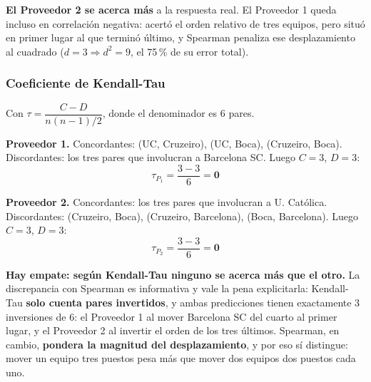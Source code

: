 \documentclass[11pt, a4paper]{article}
\begin{document}
\textbf{El Proveedor 2 se acerca más} a la respuesta real. El Proveedor 1 queda incluso en
correlación negativa: acertó el orden relativo de tres equipos, pero situó en primer lugar al que
terminó último, y Spearman penaliza ese desplazamiento al cuadrado ($d = 3 \Rightarrow d^2 = 9$, el
75\,\% de su error total).

\subsubsection{Coeficiente de Kendall-Tau}

Con $\tau = \dfrac{C - D}{n(n-1)/2}$, donde el denominador es $6$ pares.

\textbf{Proveedor 1.} Concordantes: (UC, Cruzeiro), (UC, Boca), (Cruzeiro, Boca). Discordantes: los
tres pares que involucran a Barcelona SC. Luego $C = 3$, $D = 3$:
\begin{equation}
\tau_{P_1} = \frac{3-3}{6} = \mathbf{0}
\end{equation}

\textbf{Proveedor 2.} Concordantes: los tres pares que involucran a U. Católica. Discordantes:
(Cruzeiro, Boca), (Cruzeiro, Barcelona), (Boca, Barcelona). Luego $C = 3$, $D = 3$:
\begin{equation}
\tau_{P_2} = \frac{3-3}{6} = \mathbf{0}
\end{equation}

\textbf{Hay empate: según Kendall-Tau ninguno se acerca más que el otro.} La discrepancia con
Spearman es informativa y vale la pena explicitarla: Kendall-Tau \textbf{solo cuenta pares
invertidos}, y ambas predicciones tienen exactamente 3 inversiones de 6: el Proveedor 1 al mover
Barcelona SC del cuarto al primer lugar, y el Proveedor 2 al invertir el orden de los tres últimos.
Spearman, en cambio, \textbf{pondera la magnitud del desplazamiento}, y por eso sí distingue: mover
un equipo tres puestos pesa más que mover dos equipos dos puestos cada uno.
\end{document}
